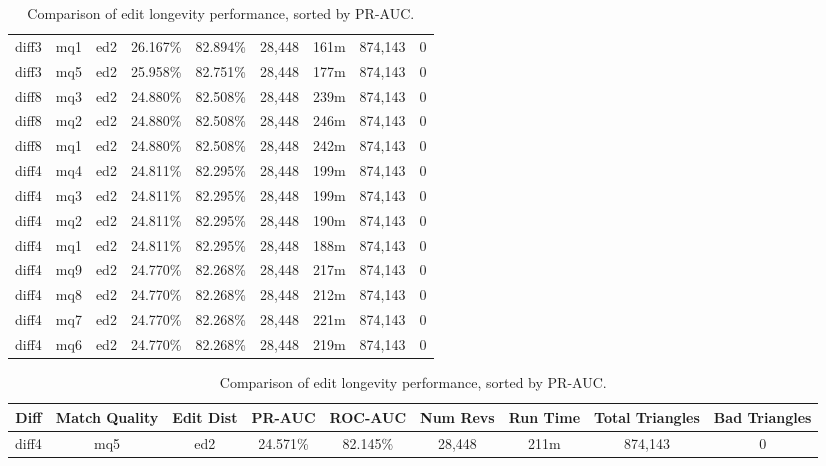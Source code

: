 \begin{sidewaystable}[!ph]
\begin{center}
\begin{tabular}{|c|c|c||c|c||c|c|c|c|}
diff3 & mq1 & ed2 & 26.167\% & 82.894\% & 28,448 & 161m & 874,143 & 0 \\
diff3 & mq5 & ed2 & 25.958\% & 82.751\% & 28,448 & 177m & 874,143 & 0 \\
diff8 & mq3 & ed2 & 24.880\% & 82.508\% & 28,448 & 239m & 874,143 & 0 \\
diff8 & mq2 & ed2 & 24.880\% & 82.508\% & 28,448 & 246m & 874,143 & 0 \\
diff8 & mq1 & ed2 & 24.880\% & 82.508\% & 28,448 & 242m & 874,143 & 0 \\
diff4 & mq4 & ed2 & 24.811\% & 82.295\% & 28,448 & 199m & 874,143 & 0 \\
diff4 & mq3 & ed2 & 24.811\% & 82.295\% & 28,448 & 199m & 874,143 & 0 \\
diff4 & mq2 & ed2 & 24.811\% & 82.295\% & 28,448 & 190m & 874,143 & 0 \\
diff4 & mq1 & ed2 & 24.811\% & 82.295\% & 28,448 & 188m & 874,143 & 0 \\
diff4 & mq9 & ed2 & 24.770\% & 82.268\% & 28,448 & 217m & 874,143 & 0 \\
diff4 & mq8 & ed2 & 24.770\% & 82.268\% & 28,448 & 212m & 874,143 & 0 \\
diff4 & mq7 & ed2 & 24.770\% & 82.268\% & 28,448 & 221m & 874,143 & 0 \\
diff4 & mq6 & ed2 & 24.770\% & 82.268\% & 28,448 & 219m & 874,143 & 0 \\
\hline
\end{tabular}
\end{center}
\caption{Comparison of edit longevity performance,
    sorted by PR-AUC.}
\label{tab:editshoutM}
\end{sidewaystable}
\clearpage
\begin{sidewaystable}[!ph]
  \begin{center}
    \begin{tabular}{|c|c|c||c|c||c|c|c|c|}
\hline
Diff & Match Quality & Edit Dist
        & PR-AUC & ROC-AUC
        & Num Revs & Run Time
        & Total Triangles & Bad Triangles \\
\hline
\hline
diff4 & mq5 & ed2 & 24.571\% & 82.145\% & 28,448 & 211m & 874,143 & 0 \\
\hline
\end{tabular}
\end{center}
\caption{Comparison of edit longevity performance,
    sorted by PR-AUC.}
\label{tab:editshoutN}
\end{sidewaystable}
\clearpage
